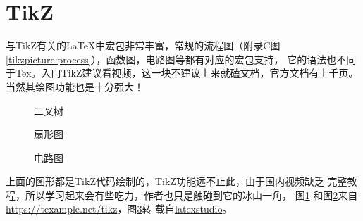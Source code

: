 \newpage
\section{TikZ}
与TikZ有关的\LaTeX 中宏包非常丰富，常规的流程图（附录C图\ref{tikzpicture:process}），函数图，电路图等都有对应的宏包支持，
它的语法也不同于Tex。入门TikZ建议看视频，这一块不建议上来就磕文档，官方文档有上千页。当然其绘图功能也是十分强大！

\begin{figure}[h]
    \centering
    
    \caption{二叉树}
    \label{tikzpic:tree}
\end{figure}
\begin{figure}[h]
    \centering
     
    \caption{扇形图}
    \label{tikzpic:pie}
\end{figure}
\newpage
\begin{figure}[t]
     \centering
     
    \caption{电路图}
    \label{tikzpic:circuit}
\end{figure}

上面的图形都是TikZ代码绘制的，TikZ功能远不止此，由于国内视频缺乏
完整教程，所以学习起来会有些吃力，作者也只是触碰到它的冰山一角，
图\ref{tikzpic:tree} 和图\ref{tikzpic:pie}来自
\url{https://texample.net/tikz}，图\ref{tikzpic:circuit}转
载自\href{https://www.latexstudio.net/index/details/index/mid/2302}{latexstudio}。